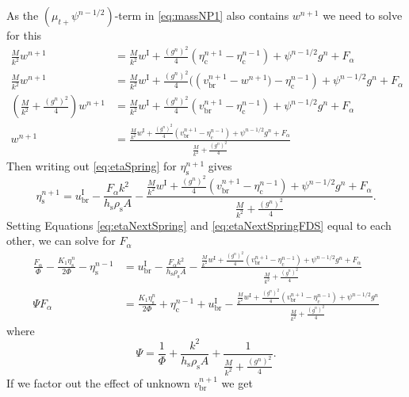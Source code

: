 \documentclass{article}
\begin{document}
As the $(\mu_{t+}\psi^{n-1/2})$-term in \eqref{eq:massNP1} also contains $w^{n+1}$ we need to solve for this
\begin{align}\label{eq:solveForNP1}
    \frac{M}{k^2}w^{n+1} &= \frac{M}{k^2}w^\text{I}+\frac{(g^n)^2}{4}(\eta_\text{c}^{n+1}-\eta_\text{c}^{n-1})+\psi^{n-1/2}g^n+F_\alpha\nonumber\\
    \frac{M}{k^2}w^{n+1} &= \frac{M}{k^2}w^\text{I}+\frac{(g^n)^2}{4}\big((v^{n+1}_\text{br} - w^{n+1}\big)-\eta_\text{c}^{n-1})+\psi^{n-1/2}g^n+F_\alpha\nonumber\\
    \left(\frac{M}{k^2}+\frac{(g^n)^2}{4}\right)w^{n+1} &= \frac{M}{k^2}w^\text{I}+\frac{(g^n)^2}{4}(v^{n+1}_\text{br}-\eta_\text{c}^{n-1})+\psi^{n-1/2}g^n+F_\alpha\nonumber\\
    w^{n+1} &= \frac{\frac{M}{k^2}w^\text{I}+\frac{(g^n)^2}{4}(v^{n+1}_\text{br}-\eta_\text{c}^{n-1})+\psi^{n-1/2}g^n+F_\alpha}{\frac{M}{k^2}+\frac{(g^n)^2}{4}}
\end{align}
Then writing out \eqref{eq:etaSpring} for $\eta_\text{s}^{n+1}$ gives
\begin{equation}\label{eq:etaNextSpringFDS}
    \eta_\text{s}^{n+1} =u^\text{I}_\text{br}-\frac{F_\alpha k^2}{h_\text{s}\rho_\text{s}A}-\frac{\frac{M}{k^2}w^\text{I}+\frac{(g^n)^2}{4}(v_{\text{br}}^{n+1}-\eta_\text{c}^{n-1}) + \psi^{n-1/2}g^n + F_\alpha}{\frac{M}{k^2}+\frac{(g^n)^2}{4}}.
\end{equation}
Setting Equations \eqref{eq:etaNextSpring} and \eqref{eq:etaNextSpringFDS} equal to each other, we can solve for $F_\alpha$
\begin{align}
        \frac{F_\alpha}{\Phi}-\frac{K_1\eta_\text{s}^n}{2\Phi}-\eta_\text{s}^{n-1}&= u^\text{I}_\text{br}-\frac{F_\alpha k^2}{h_\text{s}\rho_\text{s}A}-\frac{\frac{M}{k^2}w^\text{I}+\frac{(g^n)^2}{4}(v_{\text{br}}^{n+1}-\eta_\text{c}^{n-1}) + \psi^{n-1/2}g^n + F_\alpha}{\frac{M}{k^2}+\frac{(g^n)^2}{4}}\nonumber\\
    \Psi F_\alpha &= \frac{K_1\eta_\text{s}^n}{2\Phi}+\eta_\text{c}^{n-1}+ u^\text{I}_\text{br}-\frac{\frac{M}{k^2}w^\text{I}+\frac{(g^n)^2}{4}(v_{\text{br}}^{n+1}-\eta_\text{c}^{n-1}) + \psi^{n-1/2}g^n}{\frac{M}{k^2}+\frac{(g^n)^2}{4}}
\end{align}
where 
\begin{equation}
    \Psi = \frac{1}{\Phi} + \frac{k^2}{h_\text{s}\rho_\text{s}A}+\frac{1}{\frac{M}{k^2}+\frac{(g^n)^2}{4}}.
\end{equation}
If we factor out the effect of unknown $v_\text{br}^{n+1}$ we get
\end{document}
